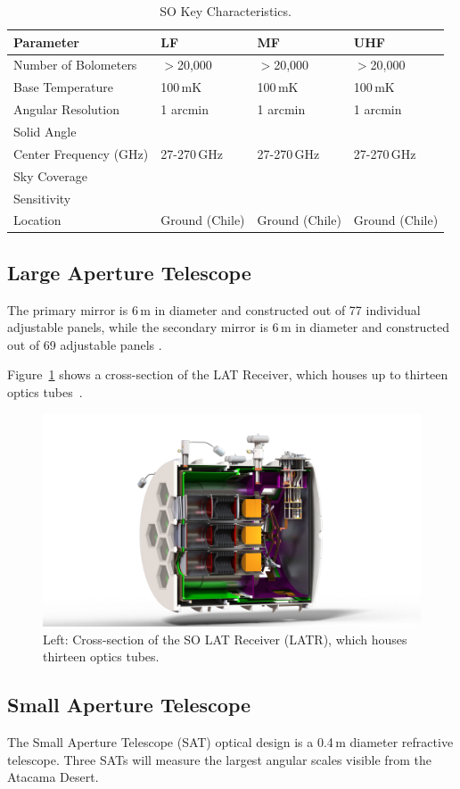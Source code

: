 \begin{table}[ht]
    \centering
    \begin{tabular}{|l|l|l|l|} \hline
        \textbf{ Parameter} &  \textbf{LF} &  \textbf{MF}  &  \textbf{UHF}  \\ \hline \hline
        Number of Bolometers & $>$20,000& $>$20,000& $>$20,000\\\hline
        Base Temperature & 100\,mK & 100\,mK & 100\,mK\\\hline
        Angular Resolution & 1 arcmin &1 arcmin &1 arcmin\\\hline
        Solid Angle & & &\\\hline
        Center Frequency (GHz) & 27-270\,GHz & 27-270\,GHz & 27-270\,GHz\\\hline
        Sky Coverage & & &\\\hline
        Sensitivity & & &\\\hline
        Location & Ground (Chile)& Ground (Chile)& Ground (Chile)\\
        \hline
    \end{tabular} \caption{SO Key Characteristics.}
    \label{tab:so}
\end{table}

\subsection{Large Aperture Telescope}
The primary mirror is 6\,m in diameter and constructed out of 77 individual adjustable panels, while the secondary mirror is 6\,m in diameter and constructed out of 69 adjustable panels \cite{gali18}.

Figure~\ref{fig:LATR_Cross} shows a cross-section of the LAT Receiver, which houses up to thirteen optics tubes~\cite{Xu_2021}.
\begin{figure}[H]
    \centering
    \includegraphics[width = .75\textwidth]{Figures/LATR_XSectionISO_HQ_20180328.png}
    \caption{Left: Cross-section of the SO LAT Receiver (LATR), which houses thirteen optics tubes.}
    \label{fig:LATR_Cross}
\end{figure}

\subsection{Small Aperture Telescope}

The Small Aperture Telescope (SAT) optical design is a 0.4\,m diameter refractive telescope.  Three SATs will measure the largest angular scales visible from the Atacama Desert.